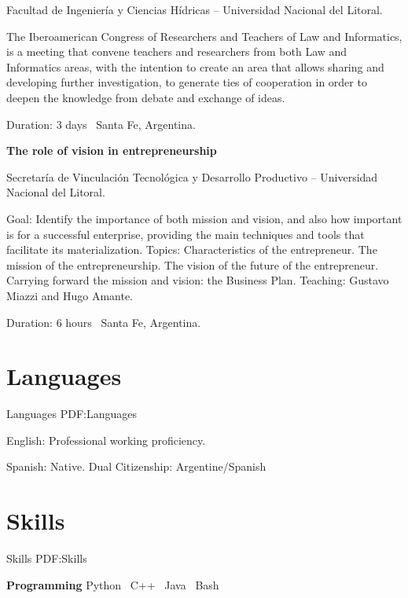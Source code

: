 \documentclass[letterpaper,MMMyyyy,nonstop]{simpleresumecv}
\begin{document}
\begin{body}
\BulletItem Facultad de Ingeniería y Ciencias Hídricas – Universidad Nacional del Litoral.
\begin{detail}
	\SubBulletItem
	The Iberoamerican Congress of Researchers and Teachers of Law and Informatics, is a meeting that convene teachers and researchers from both Law and Informatics areas, with the intention to create an area that allows sharing and developing further investigation, to generate ties of cooperation in order to deepen the knowledge from debate and exchange of ideas.
\end{detail}
Duration: 3 days \SubBulletSymbol\, Santa Fe, Argentina.

\BigGap
\textbf{The role of vision in entrepreneurship}
\hfill
{}

\BulletItem Secretaría de Vinculación Tecnológica y Desarrollo Productivo – Universidad Nacional del Litoral.
\begin{detail}
	\SubBulletItem
	Goal: Identify the importance of both mission and vision, and also how important is for a successful enterprise, providing the main techniques and tools that facilitate its materialization.
	\SubBulletItem
	Topics: Characteristics of the entrepreneur. The mission of the entrepreneurship. The vision of the future of the entrepreneur. Carrying forward the mission and vision: the Business Plan.
	\SubBulletItem
	Teaching: Gustavo Miazzi and Hugo Amante. 
\end{detail}
Duration: 6 hours \SubBulletSymbol\, Santa Fe, Argentina.


\section
{Languages}
{Languages}
{PDF:Languages}

\BulletItem
English: Professional working proficiency.

\GapNoBreak
\BulletItem
Spanish: Native.
\GapNoBreak
\BulletItem
Dual Citizenship: Argentine/Spanish


\section
{Skills}
{Skills}
{PDF:Skills}

\textbf{Programming}
\BulletItem Python \SubBulletSymbol\, C++ \SubBulletSymbol\, Java \SubBulletSymbol\, Bash


\end{body}
\end{document}
